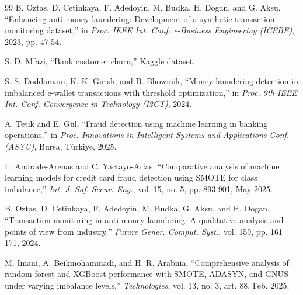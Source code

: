 \documentclass[10pt,twocolumn,a4paper]{article}
\begin{document}
\begin{thebibliography}{99}
 B. Oztas, D. Cetinkaya, F. Adedoyin, M. Budka, H. Dogan, and G. Aksu, ``Enhancing anti-money laundering: Development of a synthetic transaction monitoring dataset,'' in \emph{Proc. IEEE Int. Conf. e-Business Engineering (ICEBE)}, 2023, pp. 47 54.

 S. D. Mfazi, ``Bank customer churn,'' Kaggle dataset.

 S. S. Doddamani, K. K. Girish, and B. Bhowmik, ``Money laundering detection in imbalanced e-wallet transactions with threshold optimization,'' in \emph{Proc. 9th IEEE Int. Conf. Convergence in Technology (I2CT)}, 2024.

 A. Tetik and E. G\"{u}l, ``Fraud detection using machine learning in banking operations,'' in \emph{Proc. Innovations in Intelligent Systems and Applications Conf. (ASYU)}, Bursa, T\"{u}rkiye, 2025.

 L. Andrade-Arenas and C. Yactayo-Arias, ``Comparative analysis of machine learning models for credit card fraud detection using SMOTE for class imbalance,'' \emph{Int. J. Saf. Secur. Eng.}, vol. 15, no. 5, pp. 893 901, May 2025.

 B. Oztas, D. Cetinkaya, F. Adedoyin, M. Budka, G. Aksu, and H. Dogan, ``Transaction monitoring in anti-money laundering: A qualitative analysis and points of view from industry,'' \emph{Future Gener. Comput. Syst.}, vol. 159, pp. 161 171, 2024.

 M. Imani, A. Beikmohammadi, and H. R. Arabnia, ``Comprehensive analysis of random forest and XGBoost performance with SMOTE, ADASYN, and GNUS under varying imbalance levels,'' \emph{Technologies}, vol. 13, no. 3, art. 88, Feb. 2025.

\end{thebibliography}
\endgroup
\end{document}
